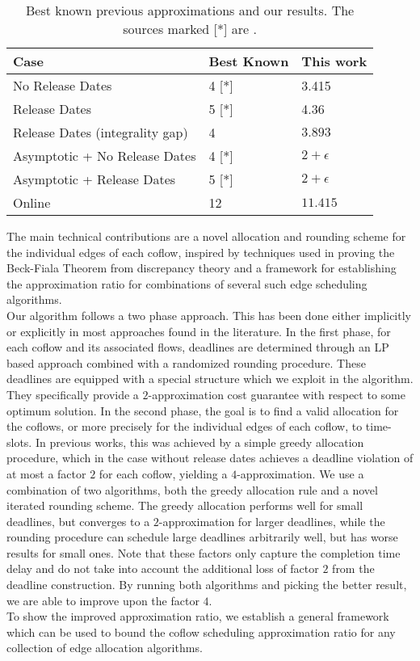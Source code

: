 \documentclass[11pt]{article}
\begin{document}
\begin{table}[H]
\centering
\renewcommand{\arraystretch}{1.2}
\begin{tabular}{l@{\hskip 6\tabcolsep}l@{\hskip 6\tabcolsep}l}\toprule
      Case     & Best Known  & This work\\\midrule
No Release Dates    & 4\phantom{00} [*] & 3.415\\
Release Dates & 5\phantom{00} [*] & 4.36\\
Release Dates (integrality gap) & 4\phantom{00} \cite{fukunaga22} & $3.893$\\
Asymptotic + No Release Dates & 4\phantom{00} [*] & $2+\epsilon$\\
Asymptotic + Release Dates   & 5\phantom{00} [*] &  $2+\epsilon$\\
Online & 12\phantom{0} \cite{khuller_select_2019} & $11.415$\\\bottomrule
\end{tabular}
\caption{Best known previous approximations and our results. The sources marked [*] are \cite{ahmadi_scheduling_2017,agarwal_sincronia_2018,fukunaga22}.}
\label{tab:algperf}
\end{table}

The main technical contributions are a novel allocation and rounding scheme for the individual edges of each coflow, inspired by techniques used in proving the Beck-Fiala Theorem from discrepancy theory and a framework for establishing the approximation ratio for combinations of several such edge scheduling algorithms.\\
Our algorithm follows a two phase approach. This has been done either implicitly or explicitly in most approaches found in the literature. In the first phase, for each coflow and its associated flows, deadlines are determined through an LP based approach combined with a randomized rounding procedure. These deadlines are equipped with a special structure which we exploit in the algorithm. They specifically provide a $2$-approximation cost guarantee with respect to some optimum solution.
In the second phase, the goal is to find a valid allocation for the coflows, or more precisely for the individual edges of each coflow, to time-slots. In previous works, this was achieved by a simple greedy allocation procedure, which in the case without release dates achieves a deadline violation of at most a factor $2$ for each coflow, yielding a $4$-approximation. We use a combination of two algorithms, both the greedy allocation rule and a novel iterated rounding scheme. The greedy allocation performs well for small deadlines, but converges to a $2$-approximation for larger deadlines, while the rounding procedure can schedule large deadlines arbitrarily well, but has worse results for small ones. Note that these factors only capture the completion time delay and do not take into account the additional loss of factor $2$ from the deadline construction. By running both algorithms and picking the better result, we are able to improve upon the factor $4$.\\
To show the improved approximation ratio, we establish a general framework which can be used to bound the coflow scheduling approximation ratio for any collection of edge allocation algorithms.
\end{document}

